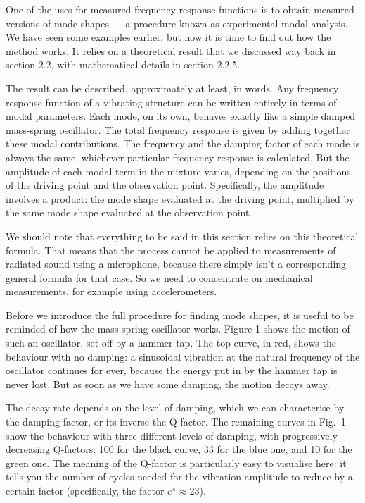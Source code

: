 

  One of the uses for measured frequency response functions is to obtain 
  measured versions of mode shapes — a procedure known as experimental modal 
  analysis. We have seen some examples earlier, but now it is time to find out 
  how the method works. It relies on a theoretical result that we discussed way 
  back in section 2.2, with mathematical details in section 2.2.5. 

  The result can be described, approximately at least, in words. Any frequency 
  response function of a vibrating structure can be written entirely in terms 
  of modal parameters. Each mode, on its own, behaves exactly like a simple 
  damped mass-spring oscillator. The total frequency response is given by 
  adding together these modal contributions. The frequency and the damping 
  factor of each mode is always the same, whichever particular frequency 
  response is calculated. But the amplitude of each modal term in the mixture 
  varies, depending on the positions of the driving point and the observation 
  point. Specifically, the amplitude involves a product: the mode shape 
  evaluated at the driving point, multiplied by the same mode shape evaluated 
  at the observation point. 

  We should note that everything to be said in this section relies on this 
  theoretical formula. That means that the process cannot be applied to 
  measurements of radiated sound using a microphone, because there simply isn't 
  a corresponding general formula for that case. So we need to concentrate on 
  mechanical measurements, for example using accelerometers. 

  Before we introduce the full procedure for finding mode shapes, it is useful 
  to be reminded of how the mass-spring oscillator works. Figure 1 shows the 
  motion of such an oscillator, set off by a hammer tap. The top curve, in red, 
  shows the behaviour with no damping: a sinusoidal vibration at the natural 
  frequency of the oscillator continues for ever, because the energy put in by 
  the hammer tap is never lost. But as soon as we have some damping, the motion 
  decays away. 

  The decay rate depends on the level of damping, which we can characterise by 
  the damping factor, or its inverse the Q-factor. The remaining curves in 
  Fig.\ 1 show the behaviour with three different levels of damping, with 
  progressively decreasing Q-factors: 100 for the black curve, 33 for the blue 
  one, and 10 for the green one. The meaning of the Q-factor is particularly 
  easy to visualise here: it tells you the number of cycles needed for the 
  vibration amplitude to reduce by a certain factor (specifically, the factor 
  $e^\pi \approx 23$). 

